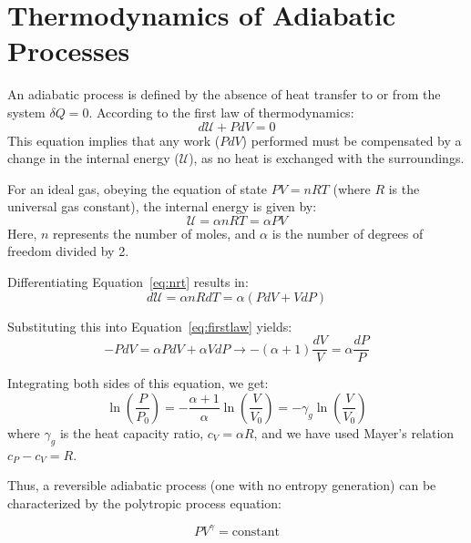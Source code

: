 \section{Thermodynamics of Adiabatic Processes}

An adiabatic process is defined by the absence of heat transfer to or from the system \( \delta Q = 0 \). According to the first law of thermodynamics:
\begin{equation}
\label{eq:firstlaw}
d\mathcal U + PdV = 0
\end{equation}
This equation implies that any work (\(PdV\)) performed must be compensated by a change in the internal energy (\(\mathcal U\)), as no heat is exchanged with the surroundings.

For an ideal gas, obeying the equation of state \(PV = nRT\) (where \(R\) is the universal gas constant), the internal energy is given by:
\begin{equation}
\label{eq:nrt} 
\mathcal U = \alpha n R T = \alpha PV 
\end{equation}
Here, \(n\) represents the number of moles, and \( \alpha \) is the number of degrees of freedom divided by 2.

Differentiating Equation~\ref{eq:nrt} results in:
\begin{equation}\label{eq:dunrdt}
d\mathcal U = \alpha n R dT = \alpha (P dV + V dP)
\end{equation}

Substituting this into Equation~\ref{eq:firstlaw} yields:
\begin{equation}
- PdV = \alpha P dV + \alpha V dP \rightarrow -(\alpha + 1) \frac{dV}{V} = \alpha \frac{dP}{P}
\end{equation}

Integrating both sides of this equation, we get:
\begin{equation}
\ln \left( \frac{P}{P_0} \right) = - \frac{\alpha + 1}{\alpha} \ln \left( \frac{V}{V_0} \right) = - \gamma_g \ln \left( \frac{V}{V_0} \right)
\end{equation}
where \( \gamma_g \) is the heat capacity ratio, \( c_V = \alpha R \), and we have used Mayer's relation \(c_P - c_V = R\).

Thus, a reversible adiabatic process (one with no entropy generation) can be characterized by the polytropic process equation:
\begin{remark}
\begin{equation}
PV^\gamma = \text{constant}
\end{equation}
\end{remark}

